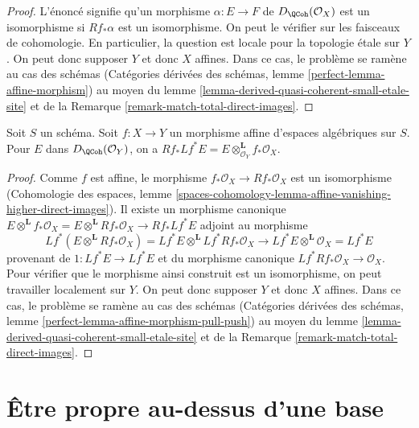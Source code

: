 \begin{proof}
L'énoncé signifie qu'un morphisme $\alpha : E \to F$ de
$D_\QCoh(\mathcal{O}_X)$ est un isomorphisme si
$Rf_*\alpha$ est un isomorphisme. On peut le vérifier sur les faisceaux de cohomologie.
En particulier, la question est locale pour la topologie \'etale sur $Y$. On peut donc supposer
$Y$ et donc $X$ affines. Dans ce cas, le problème se ramène au
cas des schémas
(Catégories dérivées des schémas, lemme \ref{perfect-lemma-affine-morphism})
au moyen du lemme \ref{lemma-derived-quasi-coherent-small-etale-site} et de la
Remarque \ref{remark-match-total-direct-images}.
\end{proof}

\begin{lemma}
\label{lemma-affine-morphism-pull-push}
Soit $S$ un schéma. Soit $f : X \to Y$ un morphisme affine d'espaces algébriques
sur $S$. Pour $E$ dans $D_\QCoh(\mathcal{O}_Y)$, on a
$Rf_* Lf^* E = E \otimes^\mathbf{L}_{\mathcal{O}_Y} f_*\mathcal{O}_X$.
\end{lemma}

\begin{proof}
Comme $f$ est affine, le morphisme $f_*\mathcal{O}_X \to Rf_*\mathcal{O}_X$
est un isomorphisme (Cohomologie des espaces, lemme
\ref{spaces-cohomology-lemma-affine-vanishing-higher-direct-images}).
Il existe un morphisme canonique
$E \otimes^\mathbf{L} f_*\mathcal{O}_X =
E \otimes^\mathbf{L} Rf_*\mathcal{O}_X \to Rf_* Lf^* E$
adjoint au morphisme
$$
Lf^*(E \otimes^\mathbf{L} Rf_*\mathcal{O}_X) =
Lf^*E \otimes^\mathbf{L} Lf^*Rf_*\mathcal{O}_X \longrightarrow
Lf^* E \otimes^\mathbf{L} \mathcal{O}_X = Lf^* E
$$
provenant de $1 : Lf^*E \to Lf^*E$ et du morphisme canonique
$Lf^*Rf_*\mathcal{O}_X \to \mathcal{O}_X$. Pour vérifier que le morphisme ainsi construit
est un isomorphisme, on peut travailler localement sur $Y$. On peut donc supposer
$Y$ et donc $X$ affines. Dans ce cas, le problème se ramène au
cas des schémas
(Catégories dérivées des schémas, lemme
\ref{perfect-lemma-affine-morphism-pull-push})
au moyen du lemme \ref{lemma-derived-quasi-coherent-small-etale-site} et de la
Remarque \ref{remark-match-total-direct-images}.
\end{proof}








\section{Être propre au-dessus d'une base}
\label{section-proper-over-base}

